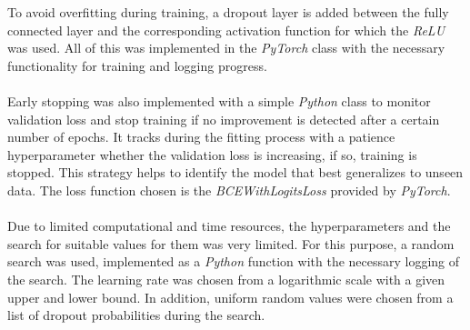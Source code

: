 \documentclass[a4paper, 11pt]{article}
\begin{document}
    To avoid overfitting during training, a dropout layer is added between the fully connected layer and the corresponding activation function for which the \textit{ReLU} was used. All of this was implemented in the \textit{PyTorch} class with the necessary functionality for training and logging progress. \\\\
    Early stopping was also implemented with a simple \textit{Python} class to monitor validation loss and stop training if no improvement is detected after a certain number of epochs. It tracks during the fitting process with a patience hyperparameter whether the validation loss is increasing, if so, training is stopped. This strategy helps to identify the model that best generalizes to unseen data. The loss function chosen is the \textit{BCEWithLogitsLoss} provided by \textit{PyTorch}. \\\\
    Due to limited computational and time resources, the hyperparameters and the search for suitable values for them was very limited. For this purpose, a random search was used, implemented as a \textit{Python} function with the necessary logging of the search. The learning rate was chosen from a logarithmic scale with a given upper and lower bound. In addition, uniform random values were chosen from a list of dropout probabilities during the search. 
\end{document}
